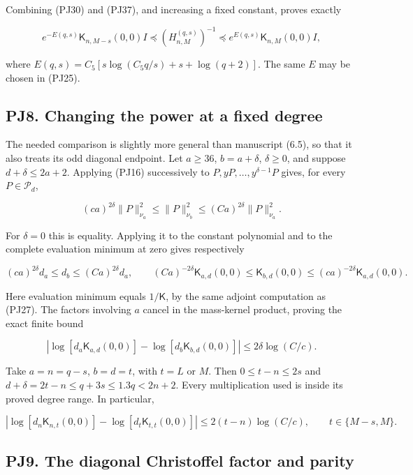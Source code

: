 \documentclass[10pt]{article}
\begin{document}
Combining (PJ30) and (PJ37), and increasing a fixed constant, proves exactly

\[
e^{-E(q,s)}\mathsf K_{n,M-s}(0,0)I
\preceq(H_{n,M}^{(q,s)})^{-1}
\preceq e^{E(q,s)}\mathsf K_{n,M}(0,0)I,
\tag{PJ38}
\]

where \(E(q,s)=C_5[s\log(C_5q/s)+s+\log(q+2)]\). The same \(E\) may be chosen in (PJ25).

\subsection{PJ8. Changing the power at a fixed degree}\label{pj8.-changing-the-power-at-a-fixed-degree}

The needed comparison is slightly more general than manuscript (6.5), so that it also treats its odd diagonal endpoint. Let \(a\ge36\), \(b=a+\delta\), \(\delta\ge0\), and suppose \(d+\delta\le2a+2\). Applying (PJ16) successively to \(P,yP,\ldots,y^{\delta-1}P\) gives, for every \(P\in\mathcal P_d\),

\[
(ca)^{2\delta}\|P\|_{\nu_a}^2
\le\|P\|_{\nu_b}^2
\le(Ca)^{2\delta}\|P\|_{\nu_a}^2.
\tag{PJ39}
\]

For \(\delta=0\) this is equality. Applying it to the constant polynomial and to the complete evaluation minimum at zero gives respectively

\[
(ca)^{2\delta}d_a\le d_b\le(Ca)^{2\delta}d_a,
\qquad
(Ca)^{-2\delta}\mathsf K_{a,d}(0,0)
\le\mathsf K_{b,d}(0,0)
\le(ca)^{-2\delta}\mathsf K_{a,d}(0,0).
\]

Here evaluation minimum equals \(1/\mathsf K\), by the same adjoint computation as (PJ27). The factors involving \(a\) cancel in the mass-kernel product, proving the exact finite bound

\[
\left|\log[d_a\mathsf K_{a,d}(0,0)]
-\log[d_b\mathsf K_{b,d}(0,0)]\right|
\le2\delta\log(C/c).
\tag{PJ40}
\]

Take \(a=n=q-s\), \(b=d=t\), with \(t=L\) or \(M\). Then \(0\le t-n\le2s\) and \(d+\delta=2t-n\le q+3s\le1.3q<2n+2\). Every multiplication used is inside its proved degree range. In particular,

\[
\left|\log[d_n\mathsf K_{n,t}(0,0)]
-\log[d_t\mathsf K_{t,t}(0,0)]\right|
\le2(t-n)\log(C/c),\qquad t\in\{M-s,M\}.
\tag{PJ41}
\]

\subsection{PJ9. The diagonal Christoffel factor and parity}\label{pj9.-the-diagonal-christoffel-factor-and-parity}
\end{document}
